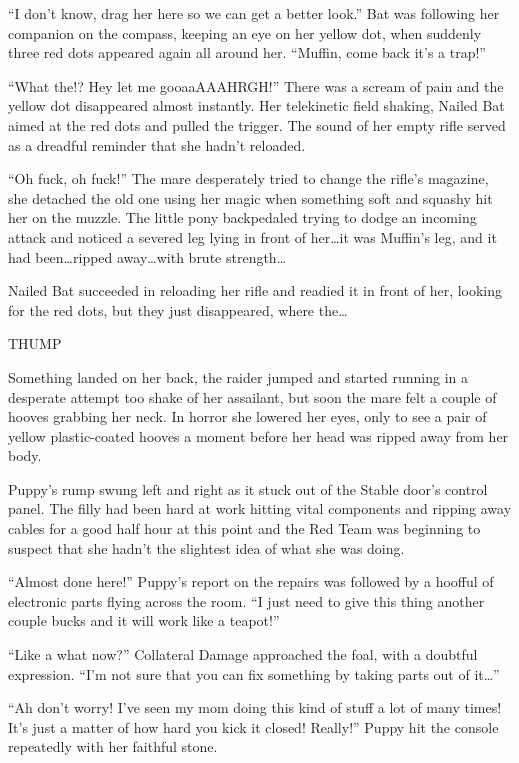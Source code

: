 ``I don't know, drag her here so we can get a better look.'' Bat was following her companion on the compass, keeping an eye on her yellow dot, when suddenly three red dots appeared again all around her. ``Muffin, come back it's a trap!''

``What the!? Hey let me gooaaAAAHRGH!'' There was a scream of pain and the yellow dot disappeared almost instantly. Her telekinetic field shaking, Nailed Bat aimed at the red dots and pulled the trigger. The sound of her empty rifle served as a dreadful reminder that she hadn't reloaded.

``Oh fuck, oh fuck!'' The mare desperately tried to change the rifle's magazine, she detached the old one using her magic when something soft and squashy hit her on the muzzle. The little pony backpedaled trying to dodge an incoming attack and noticed a severed leg lying in front of her\dots it was Muffin's leg, and it had been\dots ripped away\dots with brute strength\dots

Nailed Bat succeeded in reloading her rifle and readied it in front of her, looking for the red dots, but they just disappeared, where the\dots

THUMP

Something landed on her back, the raider jumped and started running in a desperate attempt too shake of her assailant, but soon the mare felt a couple of hooves grabbing her neck. In horror she lowered her eyes, only to see a pair of yellow plastic-coated hooves a moment before her head was ripped away from her body.

\horizonline


Puppy's rump swung left and right as it stuck out of the Stable door's control panel. The filly had been hard at work hitting vital components and ripping away cables for a good half hour at this point and the Red Team was beginning to suspect that she hadn't the slightest idea of what she was doing.

``Almost done here!'' Puppy's report on the repairs was followed by a hoofful of electronic parts flying across the room. ``I just need to give this thing another couple bucks and it will work like a teapot!''

``Like a what now?'' Collateral Damage approached the foal, with a doubtful expression. ``I'm not sure that you can fix something by taking parts out of it\dots''

``Ah don't worry! I've seen my mom doing this kind of stuff a lot of many times! It's just a matter of how hard you kick it closed! Really!'' Puppy hit the console repeatedly with her faithful stone.

